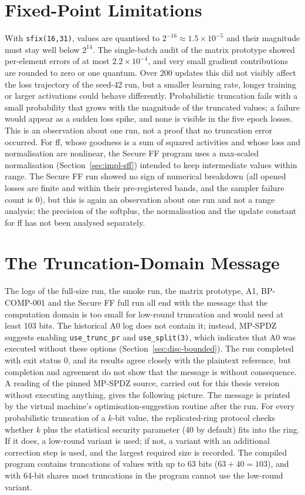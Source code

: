 \section{Fixed-Point Limitations}\label{sec:disc-fixed}
With \texttt{sfix(16,31)}, values are quantised to $2^{-16}\approx1.5\times10^{-5}$ and their magnitude must stay well below $2^{14}$. The single-batch audit of the matrix prototype showed per-element errors of at most $2.2\times10^{-4}$, and very small gradient contributions are rounded to zero or one quantum. Over 200 updates this did not visibly affect the loss trajectory of the seed-42 run, but a smaller learning rate, longer training or larger activations could behave differently. Probabilistic truncation fails with a small probability that grows with the magnitude of the truncated values; a failure would appear as a sudden loss spike, and none is visible in the five epoch losses. This is an observation about one run, not a proof that no truncation error occurred. For \ac{ff}, whose goodness is a sum of squared activities and whose loss and normalisation are nonlinear, the Secure FF program uses a max-scaled normalisation (Section~\ref{sec:impl-sff}) intended to keep intermediate values within range. The Secure FF run showed no sign of numerical breakdown (all opened losses are finite and within their pre-registered bands, and the sampler failure count is 0), but this is again an observation about one run and not a range analysis; the precision of the softplus, the normalisation and the update constant for \ac{ff} has not been analysed separately.

\section{The Truncation-Domain Message}\label{sec:disc-trunc}
The logs of the full-size run, the smoke run, the matrix prototype, A1, BP-COMP-001 and the Secure FF full run all end with the message that the computation domain is too small for low-round truncation and would need at least 103 bits. The historical A0 log does not contain it; instead, MP-SPDZ suggests enabling \texttt{use\_trunc\_pr} and \texttt{use\_split(3)}, which indicates that A0 was executed without these options (Section~\ref{sec:disc-bounded}). The run completed with exit status 0, and its results agree closely with the plaintext reference, but completion and agreement do not show that the message is without consequence. A reading of the pinned MP-SPDZ source, carried out for this thesis version without executing anything, gives the following picture. The message is printed by the virtual machine's optimisation-suggestion routine after the run. For every probabilistic truncation of a $k$-bit value, the replicated-ring protocol checks whether $k$ plus the statistical security parameter (40 by default) fits into the ring. If it does, a low-round variant is used; if not, a variant with an additional correction step is used, and the largest required size is recorded. The compiled program contains truncations of values with up to 63 bits ($63+40=103$), and with 64-bit shares most truncations in the program cannot use the low-round variant.

